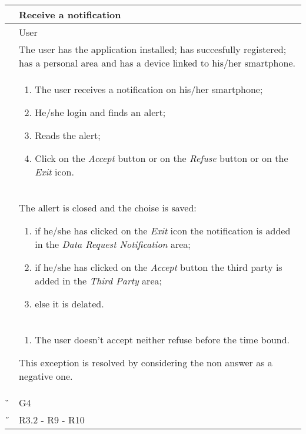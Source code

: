\begin{center}
	\begin{longtable}{ | p{} | p{} | }
		\hline
		 \A &   Receive a notification\\ 

		\hline
		 \B &  User \\ 

		\hline
  		 \C &  The user has the application installed; has succesfully registered; has a personal area and has a device linked to his/her smartphone.\\ 

		\hline
		\D & \begin{enumerate}
			\item The user receives a notification on his/her smartphone;
			\item He/she login and finds an alert;
			\item Reads the alert;
			\item Click on the \textit{Accept} button or on the \textit{Refuse} button or on the \textit{Exit} icon.
		\end{enumerate} \\

		\hline
		\E & The allert is closed and the choise is saved: \begin{enumerate}
			\item if he/she has clicked on the \textit{Exit} icon the notification is added in the \textit{Data Request Notification} 				area;
			\item if he/she has clicked on the \textit{Accept} button the third party is added in the \textit{Third Party} area;					\item else it is delated.
		\end{enumerate}\\

		\hline
		\F & \begin{enumerate}
			\item The user doesn't accept neither refuse before the time bound.
		\end{enumerate} This exception is resolved by considering the non answer as a negative one. \\
		
		\hline
		\G & G4\\

		\hline
		\H & R3.2 - R9 - R10 \\
		\hline

	\end{longtable}
\end{center}